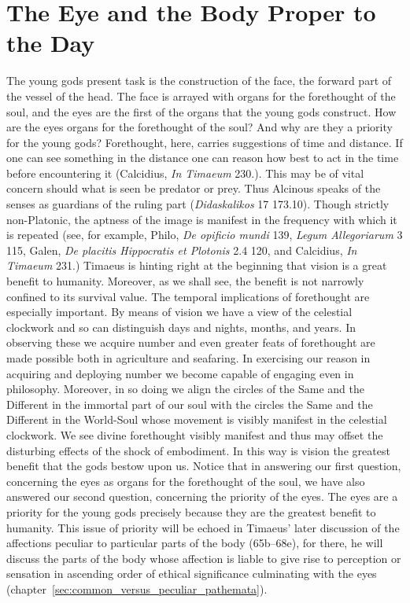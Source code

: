 
\section{The Eye and the Body Proper to the Day} %
\label{sec:the_eye_and_the_body_proper_to_the_day}

The young gods present task is the construction of the face, the forward part of the vessel of the head. The face is arrayed with organs for the forethought of the soul, and the eyes are the first of the organs that the young gods construct. How are the eyes organs for the forethought of the soul? And why are they a priority for the young gods? Forethought, here, carries suggestions of time and distance. If one can see something in the distance one can reason how best to act in the time before encountering it (Calcidius, \emph{In Timaeum} 230.). This may be of vital concern should what is seen be predator or prey. Thus Alcinous speaks of the senses as guardians of the ruling part (\emph{Didaskalikos} 17 173.10). Though strictly non-Platonic, the aptness of the image is manifest in the frequency with which it is repeated (see, for example, Philo, \emph{De opificio mundi} 139, \emph{Legum Allegoriarum} 3 115, Galen, \emph{De placitis Hippocratis et Plotonis} 2.4 120, and Calcidius, \emph{In Timaeum} 231.) Timaeus is hinting right at the beginning that vision is a great benefit to humanity. Moreover, as we shall see, the benefit is not narrowly confined to its survival value. The temporal implications of forethought are especially important. By means of vision we have a view of the celestial clockwork and so can distinguish days and nights, months, and years. In observing these we acquire number and even greater feats of forethought are made possible both in agriculture and seafaring. In exercising our reason in acquiring and deploying number we become capable of engaging even in philosophy. Moreover, in so doing we align the circles of the Same and the Different in the immortal part of our soul with the circles the Same and the Different in the World-Soul whose movement is visibly manifest in the celestial clockwork. We see divine forethought visibly manifest and thus may offset the disturbing effects of the shock of embodiment. In this way is vision the greatest benefit that the gods bestow upon us. Notice that in answering our first question, concerning the eyes as organs for the forethought of the soul, we have also answered our second question, concerning the priority of the eyes. The eyes are a priority for the young gods precisely because they are the greatest benefit to humanity. This issue of priority will be echoed in Timaeus' later discussion of the affections peculiar to particular parts of the body (65b–68e), for there, he will discuss the parts of the body whose affection is liable to give rise to perception or sensation in ascending order of ethical significance culminating with the eyes (chapter~\ref{sec:common_versus_peculiar_pathemata}).

